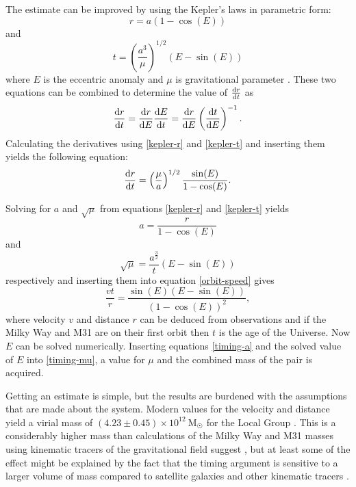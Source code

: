\documentclass[english, oneside]{HYgradu}
\begin{document}
The estimate can be improved by using the Kepler's laws in parametric form:
\begin{equation}\label{kepler-r}
r = a(1-\cos(E))
\end{equation}
and
\begin{equation}\label{kepler-t}
t = \left(\frac{a^3}{\mu}\right)^{1/2}(E-\sin(E))
\end{equation}
where $E$ is the eccentric anomaly and $\mu$ is gravitational parameter \citep{li2008masses}. These two equations can be combined to determine the value of $\dv{r}{t}$ as
\begin{equation}
\dv{r}{t} = \dv{r}{E} \dv{E}{t} = \dv{r}{E} \left(\dv{t}{E}\right)^{-1}.
\end{equation}
Calculating the derivatives using \ref{kepler-r} and \ref{kepler-t} and inserting them yields the following equation:
\begin{equation}\label{orbit-speed}
\dv{r}{t} = \left(\frac{\mu}{a}\right)^{1/2}\frac{\sin(E)}{1 - \cos(E)}.
\end{equation}

Solving for $a$ and $\sqrt{\mu}$ from equations \ref{kepler-r} and \ref{kepler-t} yields
\begin{equation}\label{timing-a}
a = \frac{r}{1-\cos(E)}
\end{equation}
and
\begin{equation}\label{timing-mu}
\sqrt{\mu} = \frac{a^\frac{3}{2}}{t}(E - \sin(E))
\end{equation}
respectively and inserting them into equation \ref{orbit-speed} gives
\begin{equation}
\frac{vt}{r} = \frac{\sin (E) \left(E - \sin(E)\right)}{(1- \cos(E))^2},
\end{equation}
where velocity $v$ and distance $r$ can be deduced from observations and if the Milky Way and M31 are on their first orbit then $t$ is the age of the Universe. Now $E$ can be solved numerically. Inserting equations \ref{timing-a} and the solved value of $E$ into \ref{timing-mu}, a value for $\mu$ and the combined mass of the pair is acquired.

Getting an estimate is simple, but the results are burdened with the assumptions that are made about the system. Modern values for the velocity and distance yield a virial mass of $(4.23 \pm 0.45) \times 10^{12}~\mathrm{M_{\astrosun}}$ for the Local Group \citep{vandermarel2012m31}. This is a considerably higher mass than calculations of the Milky Way and M31 masses using kinematic tracers of the gravitational field suggest \citep{wang2015estimating}, but at least some of the effect might be explained by the fact that the timing argument is sensitive to a larger volume of mass compared to satellite galaxies and other kinematic tracers \citep{kroeker1991accuracy}.
\end{document}
